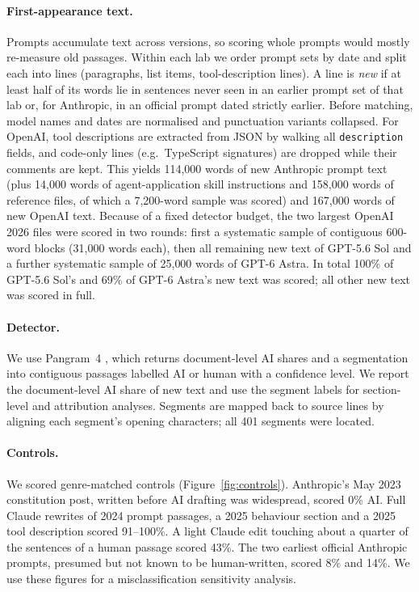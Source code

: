 \documentclass[11pt]{article}
\begin{document}
\paragraph{First-appearance text.} Prompts accumulate text across versions, so scoring whole prompts would mostly re-measure old passages. Within each lab we order prompt sets by date and split each into lines (paragraphs, list items, tool-description lines). A line is \emph{new} if at least half of its words lie in sentences never seen in an earlier prompt set of that lab or, for Anthropic, in an official prompt dated strictly earlier. Before matching, model names and dates are normalised and punctuation variants collapsed. For OpenAI, tool descriptions are extracted from JSON by walking all \texttt{description} fields, and code-only lines (e.g.\ TypeScript signatures) are dropped while their comments are kept. This yields 114{,}000 words of new Anthropic prompt text (plus 14{,}000 words of agent-application skill instructions and 158{,}000 words of reference files, of which a 7{,}200-word sample was scored) and 167{,}000 words of new OpenAI text. Because of a fixed detector budget, the two largest OpenAI 2026 files were scored in two rounds: first a systematic sample of contiguous 600-word blocks (31{,}000 words each), then all remaining new text of GPT-5.6 Sol and a further systematic sample of 25{,}000 words of GPT-6 Astra. In total 100\% of GPT-5.6 Sol's and 69\% of GPT-6 Astra's new text was scored; all other new text was scored in full.

\paragraph{Detector.} We use Pangram~4 \citep{emi2024pangram,pangram2026pricing}, which returns document-level AI shares and a segmentation into contiguous passages labelled AI or human with a confidence level. We report the document-level AI share of new text and use the segment labels for section-level and attribution analyses. Segments are mapped back to source lines by aligning each segment's opening characters; all 401 segments were located.

\paragraph{Controls.} We scored genre-matched controls (Figure~\ref{fig:controls}). Anthropic's May 2023 constitution post, written before AI drafting was widespread, scored 0\% AI. Full Claude rewrites of 2024 prompt passages, a 2025 behaviour section and a 2025 tool description scored 91--100\%. A light Claude edit touching about a quarter of the sentences of a human passage scored 43\%. The two earliest official Anthropic prompts, presumed but not known to be human-written, scored 8\% and 14\%. We use these figures for a misclassification sensitivity analysis.
\end{document}
